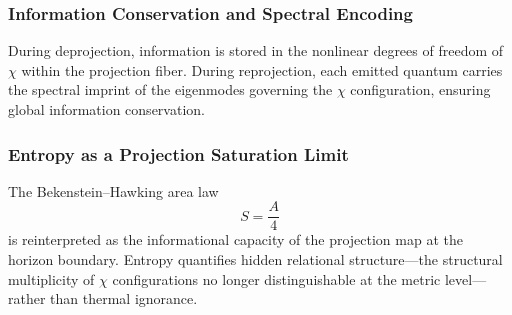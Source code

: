   \subsubsection*{Information Conservation and Spectral Encoding}
    \label{subsec:information-conservation}

    During deprojection, information is stored in the nonlinear degrees of
    freedom of~$\chi$ within the projection fiber.
    During reprojection, each emitted quantum carries the spectral imprint of
    the eigenmodes governing the $\chi$ configuration, ensuring global
    information conservation.

  \subsubsection*{Entropy as a Projection Saturation Limit}
    \label{subsubsec:entropy-projection-saturation}

    The Bekenstein--Hawking area law
    \begin{equation}
      S = \frac{A}{4}
    \end{equation}
    is reinterpreted as the informational capacity of the projection map at
    the horizon boundary.
    Entropy quantifies hidden relational structure---the structural
    multiplicity of $\chi$ configurations no longer distinguishable at the
    metric level---rather than thermal ignorance.


